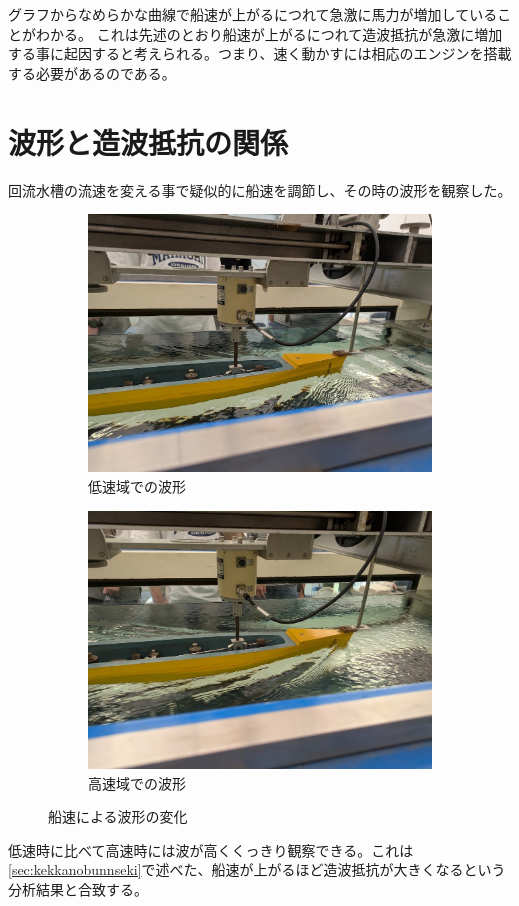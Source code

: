 \documentclass[dvipdfmx,a4paper]{jreport} %
\begin{document}
グラフからなめらかな曲線で船速が上がるにつれて急激に馬力が増加していることがわかる。
これは先述のとおり船速が上がるにつれて造波抵抗が急激に増加する事に起因すると考えられる。つまり、速く動かすには相応のエンジンを搭載する必要があるのである。


\section{波形と造波抵抗の関係}
回流水槽の流速を変える事で疑似的に船速を調節し、その時の波形を観察した。
\begin{figure}[H]
    \centering
    \begin{subfigure}[b]{0.45\textwidth}
    \includegraphics[width=\textwidth]{summer/ship-experiment/circulating-water-channel/teisoku.png}
        \caption{低速域での波形}
        \label{fig:teisoku}
    \end{subfigure}
    \hfill
    \begin{subfigure}[b]{0.45\textwidth}
        \includegraphics[width=\textwidth]{summer/ship-experiment/circulating-water-channel/kousoku.png}
        \caption{高速域での波形}
        \label{fig:kousoku}
    \end{subfigure}
    \caption{船速による波形の変化}
\end{figure}
低速時に比べて高速時には波が高くくっきり観察できる。これは\ref{sec:kekkanobunnseki}で述べた、船速が上がるほど造波抵抗が大きくなるという分析結果と合致する。
\end{document}

